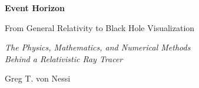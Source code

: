 \begin{titlingpage}
\begin{center}

\vspace*{3cm}

{\Huge\bfseries Event Horizon}

\vspace{0.5cm}

{\LARGE From General Relativity to Black Hole Visualization}

\vspace{1.5cm}

{\large\itshape The Physics, Mathematics, and Numerical Methods\\[2pt]
Behind a Relativistic Ray Tracer}

\vspace{3cm}

{\Large Greg T. von Nessi}

\vfill

{\large \the\year}

\end{center}
\end{titlingpage}
